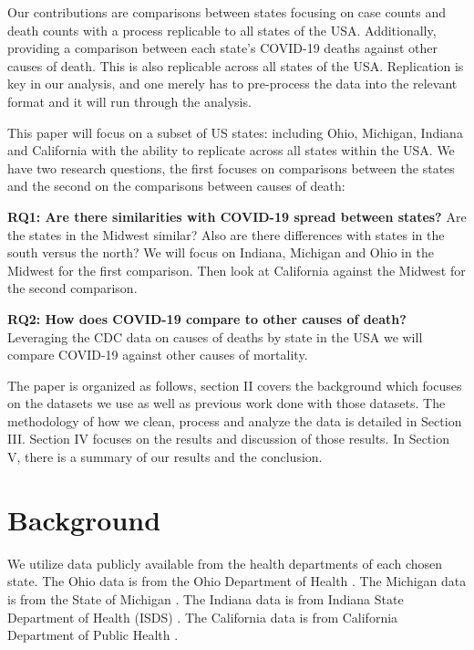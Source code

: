 \documentclass[conference]{IEEEtran}
\begin{document}
Our contributions are comparisons between states focusing on case counts and death counts with a process replicable to all states of the USA. 
Additionally, providing a comparison between each state's COVID-19 deaths against other causes of death.
This is also replicable across all states of the USA.
Replication is key in our analysis, and one merely has to pre-process the data into the relevant format and it will run through the analysis.

This paper will focus on a subset of US states: including Ohio, Michigan, Indiana and California with the ability to replicate across all states within the USA.
We have two research questions, the first focuses on comparisons between the states and the second on the comparisons between causes of death:

\textbf{RQ1: Are there similarities with COVID-19 spread between states?} Are the states in the Midwest similar? Also are there differences with states in the south versus the north? We will focus on Indiana, Michigan and Ohio in the Midwest for the first comparison. Then look at California against the Midwest for the second comparison.

\textbf{RQ2: How does COVID-19 compare to other causes of death?} Leveraging the CDC data on causes of deaths by state in the USA we will compare COVID-19 against other causes of mortality\cite{cdc_weekly_nodate}.

The paper is organized as follows, section II covers the background which focuses on the datasets we use as well as previous work done with those datasets.
The methodology of how we clean, process and analyze the data is detailed in Section III.
Section IV focuses on the results and discussion of those results.
In Section V, there is a summary of our results and the conclusion.

\section{Background}

We utilize data publicly available from the health departments of each chosen state.
The Ohio data is from the Ohio Department of Health \cite{system_covid-19_nodate}.
The Michigan data is from the State of Michigan \cite{noauthor_coronavirus_nodate}.
The Indiana data is from Indiana State Department of Health (ISDS) \cite{noauthor_indiana_nodate}.
The California data is from California Department of Public Health \cite{noauthor_tracking_nodate}.
\end{document}
